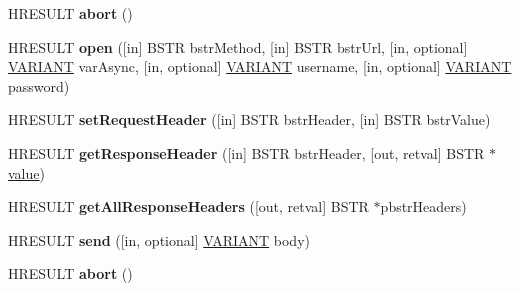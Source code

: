 \begin{DoxyCompactItemize}
H\+R\+E\+S\+U\+LT {\bfseries abort} ()
\item 
\mbox{\label{interface_m_s_x_m_l2_1_1_i_x_m_l_h_t_t_p_request_ae3bc84e9f3251a47c95dcd7326da5963}} 
H\+R\+E\+S\+U\+LT {\bfseries open} (\mbox{[}in\mbox{]} B\+S\+TR bstr\+Method, \mbox{[}in\mbox{]} B\+S\+TR bstr\+Url, \mbox{[}in, optional\mbox{]} \hyperlink{structtag_v_a_r_i_a_n_t}{V\+A\+R\+I\+A\+NT} var\+Async, \mbox{[}in, optional\mbox{]} \hyperlink{structtag_v_a_r_i_a_n_t}{V\+A\+R\+I\+A\+NT} username, \mbox{[}in, optional\mbox{]} \hyperlink{structtag_v_a_r_i_a_n_t}{V\+A\+R\+I\+A\+NT} password)
\item 
\mbox{\label{interface_m_s_x_m_l2_1_1_i_x_m_l_h_t_t_p_request_a00cbfdde8955835d077bdd8dd2d85c89}} 
H\+R\+E\+S\+U\+LT {\bfseries set\+Request\+Header} (\mbox{[}in\mbox{]} B\+S\+TR bstr\+Header, \mbox{[}in\mbox{]} B\+S\+TR bstr\+Value)
\item 
\mbox{\label{interface_m_s_x_m_l2_1_1_i_x_m_l_h_t_t_p_request_af6a3a39333faafb5c348bef6da52388d}} 
H\+R\+E\+S\+U\+LT {\bfseries get\+Response\+Header} (\mbox{[}in\mbox{]} B\+S\+TR bstr\+Header, \mbox{[}out, retval\mbox{]} B\+S\+TR $\ast$\hyperlink{unionvalue}{value})
\item 
\mbox{\label{interface_m_s_x_m_l2_1_1_i_x_m_l_h_t_t_p_request_ac7ef7f39ab302a2a492acba0a66f2b5b}} 
H\+R\+E\+S\+U\+LT {\bfseries get\+All\+Response\+Headers} (\mbox{[}out, retval\mbox{]} B\+S\+TR $\ast$pbstr\+Headers)
\item 
\mbox{\label{interface_m_s_x_m_l2_1_1_i_x_m_l_h_t_t_p_request_a334a1cc5f473bcba29051f2984024d84}} 
H\+R\+E\+S\+U\+LT {\bfseries send} (\mbox{[}in, optional\mbox{]} \hyperlink{structtag_v_a_r_i_a_n_t}{V\+A\+R\+I\+A\+NT} body)
\item 
\mbox{\label{interface_m_s_x_m_l2_1_1_i_x_m_l_h_t_t_p_request_a70823553510730e7fba9e02bc352d387}} 
H\+R\+E\+S\+U\+LT {\bfseries abort} ()
\item 
\mbox{\label{interface_m_s_x_m_l2_1_1_i_x_m_l_h_t_t_p_request_ae3bc84e9f3251a47c95dcd7326da5963}} 

\end{DoxyCompactItemize}
